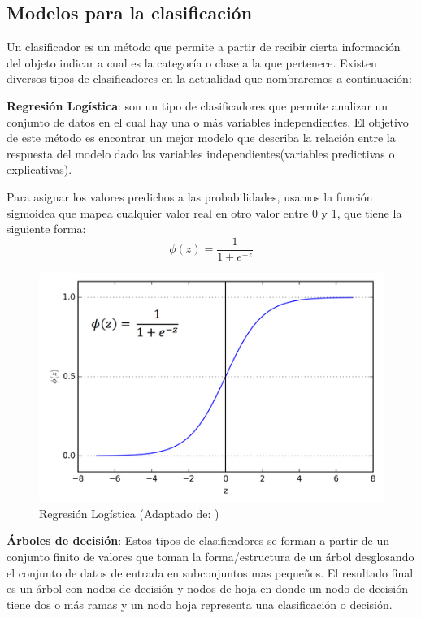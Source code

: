 \subsection{Modelos para la clasificación}\label{sub:clasificadores}

Un clasificador es un método que permite a partir de recibir cierta información del objeto indicar a cual es la categoría o clase a la que pertenece. Existen diversos tipos de clasificadores en la actualidad que nombraremos a continuación:

\par \textbf{Regresión Logística}: son un tipo de clasificadores que permite analizar un conjunto de datos en el cual hay una o más variables independientes. El objetivo de este método es encontrar un mejor modelo que describa la relación entre la respuesta del modelo dado las variables independientes(variables predictivas o explicativas). 

Para asignar los valores predichos a las probabilidades, usamos la función sigmoidea que mapea cualquier valor real en otro valor entre 0 y 1, que tiene la siguiente forma:
\begin{equation}
\phi(z) = \frac{1}{1+e^{-z}}
\end{equation}

\begin{figure}[H]
 \centering
  \includegraphics[scale=0.6]{imagenes/MarcoTeorico/sigmoide.png}
  \caption{Regresión Logística (Adaptado de: \citep{bishop})}
  \label{Fig: log_reg}
\end{figure}


\par \textbf{Árboles de decisión}: Estos tipos de clasificadores se forman a partir de  un conjunto finito de valores  que toman la forma/estructura de un árbol desglosando el conjunto de datos de entrada en subconjuntos mas pequeños. El resultado final es un árbol con nodos de decisión y nodos de hoja en donde un nodo de decisión tiene dos o más ramas y un nodo hoja representa una clasificación o decisión. 

